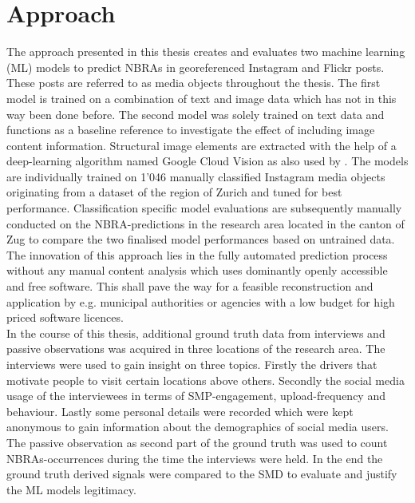 \section{Approach}
The approach presented in this thesis creates and evaluates two machine learning (ML) models to predict NBRAs in georeferenced Instagram and Flickr posts. These posts are referred to as media objects throughout the thesis. The first model is trained on a combination of text and image data which has not in this way been done before. The second model was solely trained on text data and functions as a baseline reference to investigate the effect of including image content information. Structural image elements are extracted with the help of a deep-learning algorithm named Google Cloud Vision as also used by \textcite{Richards2018}. The models are individually trained on 1'046 manually classified Instagram media objects originating from a dataset of the region of Zurich \parencite{Gruzd2016} and tuned for best performance. Classification specific model evaluations are subsequently manually conducted on the NBRA-predictions in the research area located in the canton of Zug to compare the two finalised model performances based on untrained data. The innovation of this approach lies in the fully automated prediction process without any manual content analysis which uses dominantly openly accessible and free software. This shall pave the way for a feasible reconstruction and application by e.g. municipal authorities or agencies with a low budget for high priced software licences. \\
\newline
In the course of this thesis, additional ground truth data from interviews and passive observations was acquired in three locations of the research area. The interviews were used to gain insight on three topics. Firstly the drivers that motivate people to visit certain locations above others. Secondly the social media usage of the interviewees in terms of SMP-engagement, upload-frequency and behaviour. Lastly some personal details were recorded which were kept anonymous to gain information about the demographics of social media users. The passive observation as second part of the ground truth was used to count NBRAs-occurrences during the time the interviews were held. In the end the ground truth derived signals were compared to the SMD to evaluate and justify the ML models legitimacy.


